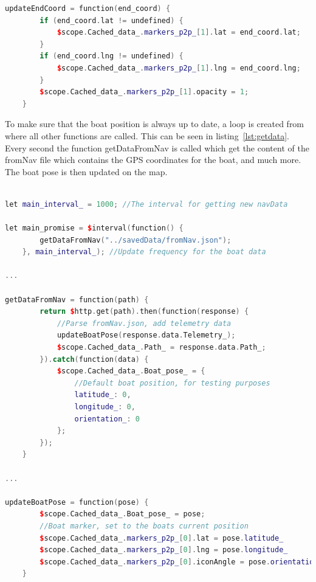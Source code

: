 \begin{lstlisting}[caption = {updateEndCoord in p2p.js}, captionpos=b, label={lst:updateendcoord}, language=C++,firstnumber=1]
updateEndCoord = function(end_coord) {
        if (end_coord.lat != undefined) {
            $scope.Cached_data_.markers_p2p_[1].lat = end_coord.lat;
        }
        if (end_coord.lng != undefined) {
            $scope.Cached_data_.markers_p2p_[1].lng = end_coord.lng;
        }
        $scope.Cached_data_.markers_p2p_[1].opacity = 1;
    }
\end{lstlisting}

To make sure that the boat position is always up to date, a loop is created from where all other functions are called. This can be seen in listing~\ref{lst:getdata}. Every second the function getDataFromNav is called which get the content of the fromNav file which contains the GPS coordinates for the boat, and much more. The boat pose is then updated on the map.

\begin{lstlisting}[caption = {Updating the boat pose in p2p.js}, captionpos=b, label={lst:getData}, language=C++,firstnumber=1]

let main_interval_ = 1000; //The interval for getting new navData

let main_promise = $interval(function() {
        getDataFromNav("../savedData/fromNav.json");
    }, main_interval_); //Update frequency for the boat data

...

getDataFromNav = function(path) {
        return $http.get(path).then(function(response) {
            //Parse fromNav.json, add telemetry data
            updateBoatPose(response.data.Telemetry_);
            $scope.Cached_data_.Path_ = response.data.Path_;
        }).catch(function(data) {
            $scope.Cached_data_.Boat_pose_ = {
                //Default boat position, for testing purposes
                latitude_: 0,
                longitude_: 0,
                orientation_: 0
            };
        });
    }
    
...

updateBoatPose = function(pose) {
        $scope.Cached_data_.Boat_pose_ = pose;
        //Boat marker, set to the boats current position
        $scope.Cached_data_.markers_p2p_[0].lat = pose.latitude_
        $scope.Cached_data_.markers_p2p_[0].lng = pose.longitude_
        $scope.Cached_data_.markers_p2p_[0].iconAngle = pose.orientation_
    }
\end{lstlisting}

